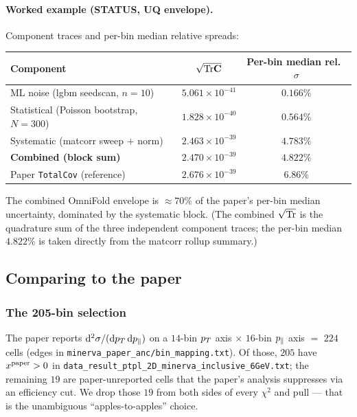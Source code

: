 \paragraph{Worked example (STATUS, UQ envelope).}
Component traces and per-bin median relative spreads:
\begin{center}
\begin{tabular}{@{}lcc@{}}
\toprule
Component & $\sqrt{\mathrm{Tr}\mathbf{C}}$ & Per-bin median rel.\ $\sigma$ \\
\midrule
ML noise (lgbm seedscan, $n=10$) & $5.061\times10^{-41}$ & $0.166\%$ \\
Statistical (Poisson bootstrap, $N=300$) & $1.828\times10^{-40}$ & $0.564\%$ \\
Systematic (matcorr sweep $+$ norm) & $2.463\times10^{-39}$ & $4.783\%$ \\
\midrule
\textbf{Combined (block sum)} & $2.470\times10^{-39}$ & $\boxed{4.822\%}$ \\
Paper \texttt{TotalCov} (reference) & $2.676\times10^{-39}$ & $6.86\%$ \\
\bottomrule
\end{tabular}
\end{center}
The combined OmniFold envelope is $\approx 70\%$ of the paper's per-bin
median uncertainty, dominated by the systematic block. (The combined
$\sqrt{\mathrm{Tr}}$ is the quadrature sum of the three independent component
traces; the per-bin median $4.822\%$ is taken directly from the
matcorr rollup summary.)

\subsection{Comparing to the paper}
\label{sec:compare}

\subsubsection{The 205-bin selection}
\label{sec:205bins}

The paper reports $\mathrm{d}^{2}\sigma/(\mathrm{d}p_{T}\,\mathrm{d}p_{\parallel})$
on a $14$-bin $p_{T}$ axis $\times$ $16$-bin $p_{\parallel}$ axis $=$ $224$
cells (edges in
\texttt{minerva\_paper\_anc/bin\_mapping.txt}). Of those, $205$ have
$x^{\text{paper}}>0$ in
\texttt{data\_result\_ptpl\_2D\_minerva\_inclusive\_6GeV.txt}; the
remaining $19$ are paper-unreported cells that the paper's analysis
suppresses via an efficiency cut. We drop those $19$ from both sides
of every $\chi^{2}$ and pull --- that is the unambiguous
``apples-to-apples'' choice.

